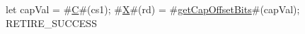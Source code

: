 let capVal = #\hyperref[sailRISCVzC]{C}#(cs1);
#\hyperref[sailRISCVzX]{X}#(rd) = #\hyperref[sailRISCVzgetCapOffsetBits]{getCapOffsetBits}#(capVal);
RETIRE_SUCCESS
